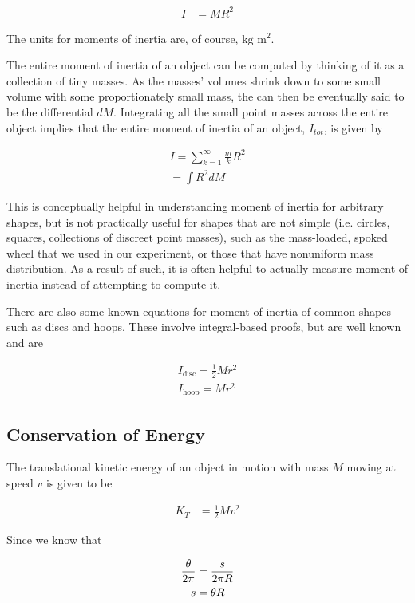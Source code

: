\documentclass[coverpage]{article}
\newcommand{\iUnit}{\text{kg $\text{m}^2$}}
\begin{document}
	\begin{align}
		I&=M R^2 \label{eq:def-i}
	\end{align}

	The units for moments of inertia are, of course, $\iUnit$.
	
	The entire moment of inertia of an object can be computed by thinking of it as a collection of tiny masses. As the masses' volumes shrink down to some small volume with some proportionately small mass, the can then be eventually said to be the differential $dM$. Integrating all the small point masses across the entire object implies that the entire moment of inertia of an object, $I_{tot}$, is given by
	
	\begin{align}
		I=\sum_{k=1}^{\infty}{\frac{m}{k}R^2}\\
		=\int{R^2dM}
	\end{align}

	This is conceptually helpful in understanding moment of inertia for arbitrary shapes, but is not practically useful for shapes that are not simple (i.e. circles, squares, collections of discreet point masses), such as the mass-loaded, spoked wheel that we used in our experiment, or those that have nonuniform mass distribution. As a result of such, it is often helpful to actually measure moment of inertia instead of attempting to compute it.
	
	There are also some known equations for moment of inertia of common shapes such as discs and hoops. These involve integral-based proofs, but are well known and are
	
	\begin{align}
		I_{\text{disc}} = \frac{1}{2} M r^2 \\
		I_{\text{hoop}} = M r^2
	\end{align}
	
	\subsection{Conservation of Energy}
	
	The translational kinetic energy of an object in motion with mass $M$ moving at speed $v$ is given to be
	
	\begin{align}
		K_T&=\frac{1}{2}Mv^2 \label{eq:translational-kinetic}
	\end{align}

	Since we know that
	
	\begin{align}
		\frac{\theta}{2\pi}&=\frac{s}{2\pi R} \notag \\
		s&=\theta R
	\end{align}
\end{document}
